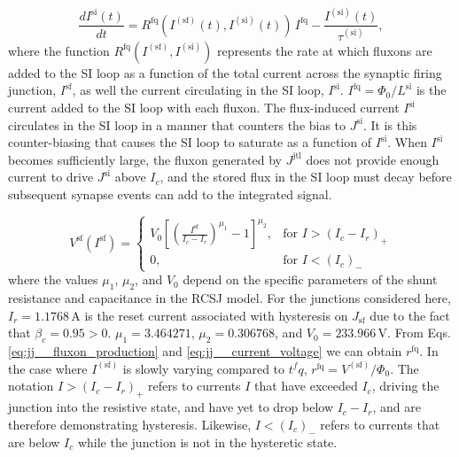 \documentclass[twocolumn]{article}
\begin{document}
\begin{equation}
\label{eq:synapses__leaky_integrator}
\frac{dI^{\mathrm{si}}(t)}{dt} = R^{\mathrm{fq}}\left(I^{(\mathrm{sf})}(t),I^{(\mathrm{si})}(t)\right)\,I^{\mathrm{fq}} -\frac{I^{(\mathrm{si})}(t)}{\tau^{(\mathrm{si})}},
\end{equation}
where the function $R^{\mathrm{fq}}\left(I^{(\mathrm{sf})},I^{(\mathrm{si})}\right)$ represents the rate at which fluxons are added to the SI loop as a function of the total current across the synaptic firing junction, $I^{\mathrm{sf}}$, as well the current circulating in the SI loop, $I^{\mathrm{si}}$. $I^{\mathrm{fq}} = \Phi_0/L^{\mathrm{si}}$ is the current added to the SI loop with each fluxon. The flux-induced current $I^{\mathrm{si}}$ circulates in the SI loop in a manner that counters the bias to $J^{\mathrm{si}}$. It is this counter-biasing that causes the SI loop to saturate as a function of $I^{\mathrm{si}}$. When $I^{\mathrm{si}}$ becomes sufficiently large, the fluxon generated by $J^{\mathrm{jtl}}$ does not provide enough current to drive $J^{\mathrm{si}}$ above $I_c$, and the stored flux in the SI loop must decay before subsequent synapse events can add to the integrated signal.

\begin{equation}
\label{eq:jj__current_voltage}
V^{\mathrm{sf}}(I^{\mathrm{sf}}) = \begin{cases} V_0\left[ \left( \frac{I^{\mathrm{sf}}}{I_c-I_r} \right)^{\mu_1} - 1 \right]^{\mu_2}, & \text{for } I > (I_c-I_r)_+ \\
0, & \text{for } I < (I_c)_-
\end{cases}
\end{equation} 
where the values $\mu_1$, $\mu_2$, and $V_0$ depend on the specific parameters of the shunt resistance and capacitance in the RCSJ model. For the junctions considered here, $I_r = 1.1768$\,\textmu A is the reset current associated with hysteresis on $J_{\mathrm{sf}}$ due to the fact that $\beta_c = 0.95 > 0$. $\mu_1 = 3.464271$, $\mu_2 = 0.306768$, and $V_0 = 233.966$\,\textmu V. From Eqs.\,\ref{eq:jj__fluxon_production} and \ref{eq:jj__current_voltage} we can obtain $r^{\mathrm{fq}}$. In the case where $I^{(\mathrm{sf})}$ is slowly varying compared to $t^fq$, $ r^{\mathrm{fq}} = V^{(\mathrm{sf})}/\Phi_0$. The notation $I > (I_c-I_r)_+$ refers to currents $I$ that have exceeded $I_c$, driving the junction into the resistive state, and have yet to drop below $I_c-I_r$, and are therefore demonstrating hysteresis. Likewise, $I<(I_c)_-$ refers to currents that are below $I_c$ while the junction is not in the hysteretic state.
\end{document}
